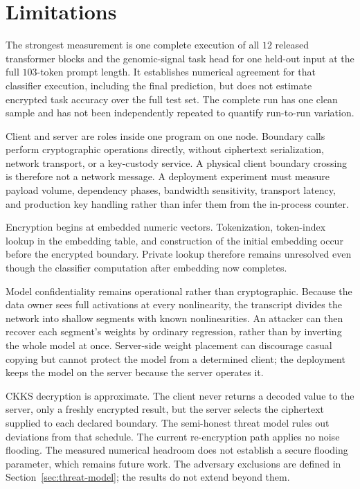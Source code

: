 
\section{Limitations}
\label{sec:limitations}

The strongest measurement is one complete execution of all $12$ released transformer blocks and
the genomic-signal task head for one held-out input at the full $103$-token prompt length. It
establishes numerical agreement for that classifier execution, including the final prediction, but
does not estimate encrypted task accuracy over the full test set. The complete run has one clean
sample and has not been independently repeated to quantify run-to-run variation.

Client and server are roles inside one program on one node. Boundary calls perform cryptographic
operations directly, without ciphertext serialization, network transport, or a key-custody service.
A physical client boundary crossing is therefore not a network message. A deployment experiment
must measure payload volume, dependency phases, bandwidth sensitivity, transport latency, and
production key handling rather than infer them from the in-process counter.

Encryption begins at embedded numeric vectors. Tokenization, token-index lookup in the embedding
table, and construction of the initial embedding occur before the encrypted boundary. Private
lookup therefore remains unresolved even though the classifier computation after embedding now
completes.

Model confidentiality remains operational rather than cryptographic. Because the data owner sees
full activations at every nonlinearity, the transcript divides the network into shallow segments
with known nonlinearities. An attacker can then recover each segment's weights by ordinary
regression, rather than by inverting the whole model at once. Server-side weight placement can
discourage casual copying but cannot
protect the model from a determined client; the deployment keeps the model on the server because
the server operates it.

CKKS decryption is approximate. The client never returns a decoded value to the server, only a
freshly encrypted result, but the server selects the ciphertext supplied to each declared boundary.
The semi-honest threat model rules out deviations from that schedule. The current re-encryption
path applies no noise flooding. The measured numerical headroom does not establish a secure
flooding parameter, which remains future work. The adversary exclusions are defined in
Section~\ref{sec:threat-model}; the results do not extend beyond them.

